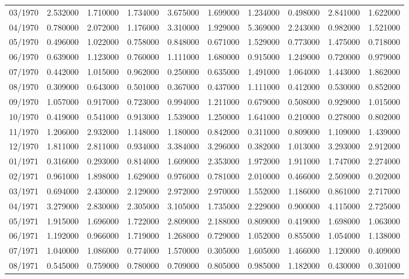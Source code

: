 \begin{tabular}{lrrrrrrrrr}
03/1970 & 2.532000 & 1.710000 & 1.734000 & 3.675000 & 1.699000 & 1.234000 & 0.498000 & 2.841000 & 1.622000 \\
04/1970 & 0.780000 & 2.072000 & 1.176000 & 3.310000 & 1.929000 & 5.369000 & 2.243000 & 0.982000 & 1.521000 \\
05/1970 & 0.496000 & 1.022000 & 0.758000 & 0.848000 & 0.671000 & 1.529000 & 0.773000 & 1.475000 & 0.718000 \\
06/1970 & 0.639000 & 1.123000 & 0.760000 & 1.111000 & 1.680000 & 0.915000 & 1.249000 & 0.720000 & 0.979000 \\
07/1970 & 0.442000 & 1.015000 & 0.962000 & 0.250000 & 0.635000 & 1.491000 & 1.064000 & 1.443000 & 1.862000 \\
08/1970 & 0.309000 & 0.643000 & 0.501000 & 0.367000 & 0.437000 & 1.111000 & 0.412000 & 0.530000 & 0.852000 \\
09/1970 & 1.057000 & 0.917000 & 0.723000 & 0.994000 & 1.211000 & 0.679000 & 0.508000 & 0.929000 & 1.015000 \\
10/1970 & 0.419000 & 0.541000 & 0.913000 & 1.539000 & 1.250000 & 1.641000 & 0.210000 & 0.278000 & 0.802000 \\
11/1970 & 1.206000 & 2.932000 & 1.148000 & 1.180000 & 0.842000 & 0.311000 & 0.809000 & 1.109000 & 1.439000 \\
12/1970 & 1.811000 & 2.811000 & 0.934000 & 3.384000 & 3.296000 & 0.382000 & 1.013000 & 3.293000 & 2.912000 \\
01/1971 & 0.316000 & 0.293000 & 0.814000 & 1.609000 & 2.353000 & 1.972000 & 1.911000 & 1.747000 & 2.274000 \\
02/1971 & 0.961000 & 1.898000 & 1.629000 & 0.976000 & 0.781000 & 2.010000 & 0.466000 & 2.509000 & 0.202000 \\
03/1971 & 0.694000 & 2.430000 & 2.129000 & 2.972000 & 2.970000 & 1.552000 & 1.186000 & 0.861000 & 2.717000 \\
04/1971 & 3.279000 & 2.830000 & 2.305000 & 3.105000 & 1.735000 & 2.229000 & 0.900000 & 4.115000 & 2.725000 \\
05/1971 & 1.915000 & 1.696000 & 1.722000 & 2.809000 & 2.188000 & 0.809000 & 0.419000 & 1.698000 & 1.063000 \\
06/1971 & 1.192000 & 0.966000 & 1.719000 & 1.268000 & 0.729000 & 1.052000 & 0.855000 & 1.054000 & 1.138000 \\
07/1971 & 1.040000 & 1.086000 & 0.774000 & 1.570000 & 0.305000 & 1.605000 & 1.466000 & 1.120000 & 0.409000 \\
08/1971 & 0.545000 & 0.759000 & 0.780000 & 0.709000 & 0.805000 & 0.985000 & 1.182000 & 0.430000 & 0.301000 \\

\end{tabular}
